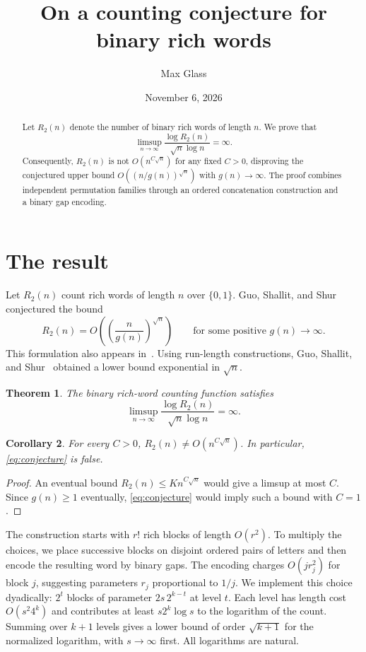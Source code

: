 \documentclass[10pt]{article}
\title{On a counting conjecture for binary rich words}
\author{Max Glass}
\date{November 6, 2026}
\newtheorem{theorem}{Theorem}
\newtheorem{corollary}[theorem]{Corollary}
\begin{document}
\maketitle
\vspace{-2em}
\begin{abstract}
Let $R_2(n)$ denote the number of binary rich words of length $n$.
We prove that
\[
 \limsup_{n\to\infty}\frac{\log R_2(n)}{\sqrt n\log n}=\infty.
\]
Consequently, $R_2(n)$ is not $O(n^{C\sqrt n})$ for any fixed $C>0$,
disproving the conjectured upper bound
$O((n/g(n))^{\sqrt n})$ with $g(n)\to\infty$.
The proof combines independent permutation families through an ordered
concatenation construction and a binary gap encoding.
\end{abstract}

\section{The result}

Let $R_2(n)$ count rich words of length $n$ over $\{0,1\}$.
Guo, Shallit, and Shur~\cite[Conjecture~1]{GSSpre} conjectured the bound
\begin{equation}\label{eq:conjecture}
 R_2(n)=O\!\left(\left(\frac{n}{g(n)}\right)^{\sqrt n}\right)
 \qquad\text{for some positive }g(n)\longrightarrow\infty.
\end{equation}
This formulation also appears in~\cite[Section~1]{Ruk}.
Using run-length constructions, Guo, Shallit, and Shur~\cite{GSS}
obtained a lower bound exponential in $\sqrt n$.

\begin{theorem}\label{thm:main}
The binary rich-word counting function satisfies
\[
 \limsup_{n\to\infty}\frac{\log R_2(n)}{\sqrt n\log n}=\infty.
\]
\end{theorem}

\begin{corollary}\label{cor:conjecture}
For every $C>0$, $R_2(n)\ne O(n^{C\sqrt n})$.
In particular, \eqref{eq:conjecture} is false.
\end{corollary}
\begin{proof}
An eventual bound $R_2(n)\le K n^{C\sqrt n}$ would give a limsup at most $C$.
Since $g(n)\ge1$ eventually, \eqref{eq:conjecture} would imply such a
bound with $C=1$.
\end{proof}

The construction starts with $r!$ rich blocks of length $O(r^2)$.
To multiply the choices, we place successive blocks on disjoint ordered
pairs of letters and then encode the resulting word by binary gaps.
The encoding charges $O(jr_j^2)$ for block $j$, suggesting parameters
$r_j$ proportional to $1/j$. We implement this choice dyadically:
$2^t$ blocks of parameter $2s\,2^{k-t}$ at level $t$. Each level has
length cost $O(s^2 4^k)$ and contributes at least $s2^k\log s$ to the
logarithm of the count. Summing over $k+1$ levels gives a lower bound of
order $\sqrt{k+1}$ for the normalized logarithm, with $s\to\infty$
first. All logarithms are natural.
\end{document}
